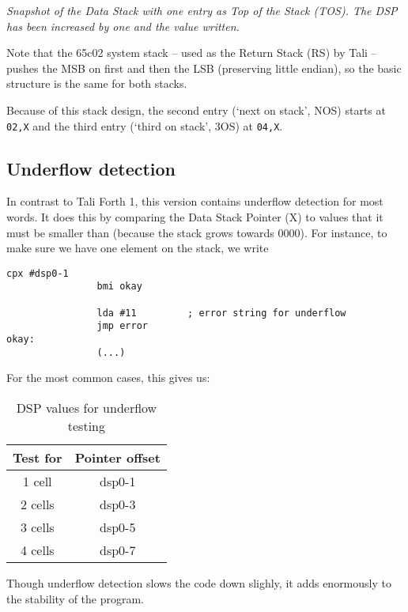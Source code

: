 \textit{Snapshot of the Data Stack with one entry as Top of the Stack (TOS). The
DSP has been increased by one and the value written.}

Note that the 65c02 system stack -- used as the Return Stack (RS) by Tali --
pushes the MSB on first and then the LSB (preserving little endian), so the
basic structure is the same for both stacks. 

Because of this stack design, the second entry (`next on stack', NOS) starts at
\texttt{02,X} and the third entry (`third on stack', 3OS) at \texttt{04,X}. 

\subsection{Underflow detection} In contrast to Tali
Forth 1, this version contains underflow detection for most
words. It does this by comparing the Data Stack Pointer (X) to
values that it must be smaller than (because the stack grows towards 0000). For
instance, to make sure we have one element on the stack, we write

\begin{lstlisting}[frame=lines]
                cpx #dsp0-1
                bmi okay

                lda #11         ; error string for underflow
                jmp error
okay:
                (...)
\end{lstlisting}

\noindent For the most common cases, this gives us:

\begin{table}[h!]
\centering
\begin{tabular}{ | c | c | }
        \hline
        Test for &  Pointer offset\\
        \hline
        1 cell   &  dsp0-1\\
        2 cells  &  dsp0-3\\
        3 cells  &  dsp0-5\\
        4 cells  &  dsp0-7\\
        \hline
\end{tabular}
        \caption{DSP values for underflow testing}
        \label{table_uf}
\end{table}

Though underflow detection slows the code down
slighly, it adds enormously to the stability of the program.

